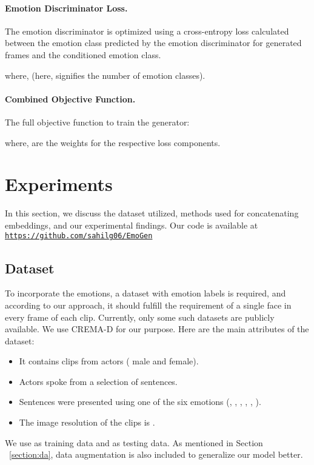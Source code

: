 \documentclass[accepted]{uai2023}
\begin{document}
\paragraph{Emotion Discriminator Loss.}
The emotion discriminator is optimized using a cross-entropy loss calculated between the emotion class predicted by the emotion discriminator for generated frames and the conditioned emotion class. 

where,  (here,  signifies the number of emotion classes).

\paragraph{Combined Objective Function.}
The full objective function to train the generator:

where,  are the weights for the respective loss components.

\section{Experiments}
In this section, we discuss the dataset utilized, methods used for concatenating embeddings, and our experimental findings. Our code is available at \href{https://github.com/sahilg06/EmoGen}{\tt{https://github.com/sahilg06/EmoGen}}



\subsection{Dataset}
To incorporate the emotions, a dataset with emotion labels is required, and according to our approach, it should fulfill the requirement of a single face in every frame of each clip.
Currently, only some such datasets are publicly available. 
We use CREMA-D for our purpose. Here are the main attributes of the dataset:
\begin{itemize}
    \item It contains  clips from  actors ( male and  female).
    \item Actors spoke from a selection of  sentences.
    \item Sentences were presented using one of the six emotions ({}, {}, {}, {}, {}, {}).
    \item The image resolution of the clips is .
\end{itemize}
We use  as training data and  as testing data. 
As mentioned in Section ~\ref{section:da}, data augmentation is also included to generalize our model better.
\end{document}
